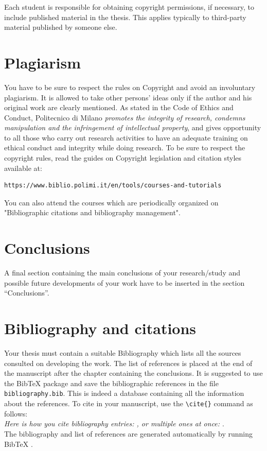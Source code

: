 \documentclass[11pt,a4paper]{article}
\begin{document}
Each student is responsible for obtaining copyright permissions, if necessary, to include published material in the thesis.
This applies typically to third-party material published by someone else.

\section{Plagiarism}

You have to be sure to respect the rules on Copyright and avoid an involuntary plagiarism.
It is allowed to take other persons' ideas only if the author and his original work are clearly mentioned.
As stated in the Code of Ethics and Conduct, Politecnico di Milano \textit{promotes the integrity of research,
condemns manipulation and the infringement of intellectual property}, and gives opportunity to all those
who carry out research activities to have an adequate training on ethical conduct and integrity while doing research.
To be sure to respect the copyright rules, read the guides on Copyright legislation and citation styles available
at:
\begin{verbatim}
https://www.biblio.polimi.it/en/tools/courses-and-tutorials
\end{verbatim}
You can also attend the courses which are periodically organized on "Bibliographic citations and bibliography management".

\section{Conclusions}
\color{black}
A final section containing the main conclusions of your research/study
and possible future developments of your work have to be inserted in the section ``Conclusions''.

\section{Bibliography and citations}
Your thesis must contain a suitable Bibliography which lists all the sources consulted on developing the work.
The list of references is placed at the end of the manuscript after the chapter containing the conclusions.
It is suggested to use the BibTeX package and save the bibliographic references in the file \verb|bibliography.bib|.
This is indeed a database containing all the information about the references. To cite in your manuscript, use the \verb|\cite{}| command as follows:
\\
\textit{Here is how you cite bibliography entries: \cite{knuth74}, or multiple ones at once: \cite{knuth92,lamport94}}.
\\
The bibliography and list of references are generated automatically by running BibTeX \cite{bibtex}.
\end{document}

